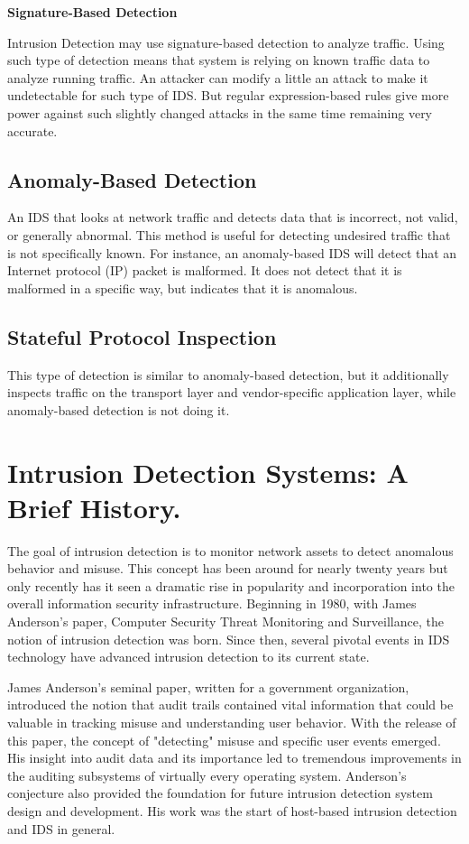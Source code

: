 \documentclass[thesis=M,english]{FITthesis}[2011/07/15]
\begin{document}
\textbf{Signature-Based Detection}

Intrusion Detection may use signature-based detection to analyze traffic. Using such type of detection means that system is relying on known traffic data to analyze running traffic. An attacker can modify a little an attack to make it undetectable for such type of IDS. But regular expression-based rules give more power against such slightly changed attacks in the same time remaining very accurate.

\subsection*{Anomaly-Based Detection}
An IDS that looks at network traffic and detects data that is incorrect, not valid, or generally abnormal. This method is useful for detecting undesired traffic that is not specifically known. For instance, an anomaly-based IDS will detect that an Internet protocol (IP) packet is malformed. It does not detect that it is malformed in a specific way, but indicates that it is anomalous.

\subsection*{Stateful Protocol Inspection}
This type of detection is similar to anomaly-based detection, but it additionally inspects traffic on the transport layer and vendor-specific application layer, while anomaly-based detection is not doing it.

\section{Intrusion Detection Systems: A Brief History.}
The goal of intrusion detection is to monitor network assets to detect anomalous behavior and misuse. This concept has been around for nearly twenty years but only recently has it seen a dramatic rise in popularity and incorporation into the overall information security infrastructure. Beginning in 1980, with James Anderson's paper, Computer Security Threat Monitoring and Surveillance, the notion of intrusion detection was born. Since then, several pivotal events in IDS technology have advanced intrusion detection to its current state.

James Anderson's seminal paper, written for a government organization, introduced the notion that audit trails contained vital information that could be valuable in tracking misuse and understanding user behavior. With the release of this paper, the concept of "detecting" misuse and specific user events emerged. His insight into audit data and its importance led to tremendous improvements in the auditing subsystems of virtually every operating system. Anderson's conjecture also provided the foundation for future intrusion detection system design and development. His work was the start of host-based intrusion detection and IDS in general.
\end{document}
